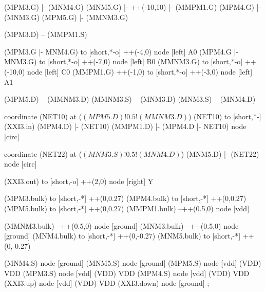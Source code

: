 \begin{circuitikz}[american]
		
	(MPM3.G) |- (MNM4.G)
	(MNM5.G) |- ++(-10,10) |- (MMPM1.G)
	(MPM4.G) |- (MNM3.G)
	(MPM5.G) |- (MMNM3.G)
	
	(MPM3.D) -- (MMPM1.S)
	
	(MPM3.G |- MNM4.G) to [short,*-o] ++(-4,0) node [left] {A0}
	(MPM4.G |- MNM3.G) to [short,*-o] ++(-7,0) node [left] {B0}
	(MMNM3.G) to [short,*-o] ++(-10,0) node [left] {C0}
	(MMPM1.G) ++(-1,0) to [short,*-o] ++(-3,0) node [left] {A1}
	
	(MPM5.D) -- (MMNM3.D)
	(MMNM3.S) -- (MNM3.D)
	(MNM3.S) -- (MNM4.D)
	
	coordinate (NET10) at ($(MPM5.D)!0.5!(MMNM3.D)$)
	(NET10) to [short,*-] (XXI3.in)
	(MPM4.D) |- (NET10)
	(MMPM1.D) |- (MPM4.D |- NET10) node [circ] {}
	
	coordinate (NET22) at ($(MNM3.S)!0.5!(MNM4.D)$)
	(MNM5.D) |- (NET22) node [circ] {}
	
	(XXI3.out) to [short,-o] ++(2,0) node [right] {Y}
	
	(MPM3.bulk) to [short,-*] ++(0,0.27)
	(MPM4.bulk) to [short,-*] ++(0,0.27)	
	(MPM5.bulk) to [short,-*] ++(0,0.27)	
	(MMPM1.bulk) --++(0.5,0) node [vdd]{}
	
	(MMNM3.bulk) --++(0.5,0) node [ground]{}
	(MNM3.bulk) --++(0.5,0) node [ground]{}
	(MNM4.bulk) to [short,-*] ++(0,-0.27)
	(MNM5.bulk) to [short,-*] ++(0,-0.27)	


	(MNM4.S) node [ground] {}
	(MNM5.S) node [ground] {}
	(MPM5.S) node [vdd] (VDD) {VDD}
	(MPM3.S) node [vdd] (VDD) {VDD}
	(MPM4.S) node [vdd] (VDD) {VDD}
	(XXI3.up) node [vdd] (VDD) {VDD}
	(XXI3.down) node [ground] {}
;

\end{circuitikz}
